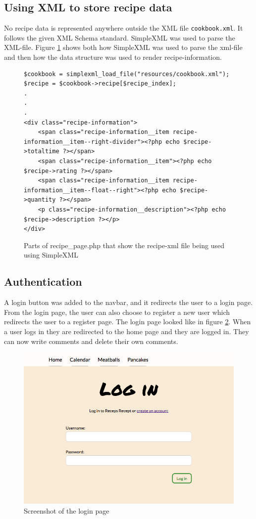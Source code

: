 \documentclass[a4paper]{scrartcl}
\begin{document}
\subsection{Using XML to store recipe data}
\label{result:xml}
No recipe data is represented anywhere outside the XML file \texttt{cookbook.xml}. It follows the given XML Schema standard. SimpleXML was used to parse the XML-file. Figure \ref{fig:simplexml-code} shows both how SimpleXML was used to parse the xml-file and then how the data structure was used to render recipe-information.

\begin{figure}
\begin{lstlisting}[frame=single, breaklines=true, basicstyle=\ttfamily\footnotesize]
$cookbook = simplexml_load_file("resources/cookbook.xml");
$recipe = $cookbook->recipe[$recipe_index];
.
.
.
<div class="recipe-information">
	<span class="recipe-information__item recipe-information__item--right-divider"><?php echo $recipe->totaltime ?></span>
	<span class="recipe-information__item"><?php echo $recipe->rating ?></span>
	<span class="recipe-information__item recipe-information__item--float--right"><?php echo $recipe->quantity ?></span>
	<p class="recipe-information__description"><?php echo $recipe->description ?></p>
</div>
\end{lstlisting}
\caption{Parts of recipe\_page.php that show the recipe-xml file being used using SimpleXML}
\label{fig:simplexml-code}
\end{figure}



\subsection{Authentication}
\label{result:auth}
A login button was added to the navbar, and it redirects the user to a login page. From the login page, the user can also choose to register a new user which redirects the user to a register page. The login page looked like in figure \ref{fig:login-page}. When a user logs in they are redirected to the home page and they are logged in. They can now write comments and delete their own comments.

\begin{figure}
	\begin{center}
		\includegraphics[width=0.7\linewidth]{images/screenshot-login_page.png}
		\caption{Screenshot of the login page}
		\label{fig:login-page}
	\end{center}
\end{figure}
\end{document}
